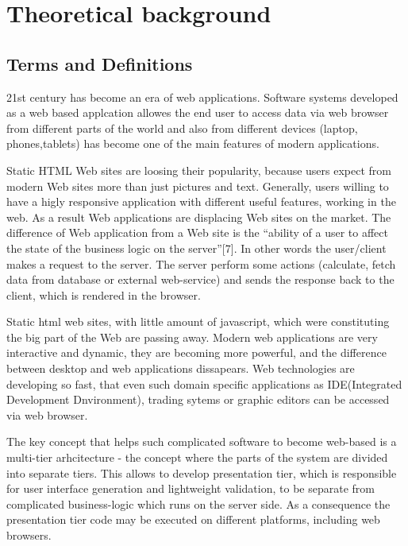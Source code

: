 \chapter{Theoretical background}
\label{ch:background} 
	\section{Terms and Definitions}
		21st century has become an era of web applications. Software systems developed
		as a web based applcation allowes the end user to access data via web browser
		from different parts of the world and also from different devices (laptop,
		phones,tablets) has become one of the main features of modern
		applications. 
		
		
	  Static HTML Web sites are loosing their popularity, because users
	  expect from modern Web sites more than just pictures and text. Generally,
	  users willing to have a higly responsive application with different useful
	  features, working in the web. As a result Web applications are displacing Web
	  sites on the market. The difference of Web application from a Web site is the
	 “ability of a user to affect the state of the business logic on the server”[7]. In other words
	  the user/client makes a request to the server. The server perform some
	  actions (calculate, fetch data from database or external web-service) and
	  sends the response back to the client, which is rendered in the browser.
		
		
		Static html web sites, with little amount of javascript, which were
		constituting the big part of the Web are passing away. Modern web
		applications are very interactive and dynamic, they are becoming
		more powerful, and the difference between desktop and web applications
		dissapears. Web technologies are developing so fast, that even such domain
		specific applications as IDE(Integrated Development Dnvironment), trading
		sytems or graphic editors can be accessed via web browser.
		
		 The key concept that helps such complicated software to become web-based is a
		 multi-tier arhcitecture - the concept where the parts of the system are divided into
		separate tiers. This allows to develop presentation tier, which is
		responsible for user interface generation and lightweight validation, to
		be separate from complicated business-logic which runs on the server
		side. As a consequence the presentation tier code may be executed on different
		platforms, including web browsers. 
		
